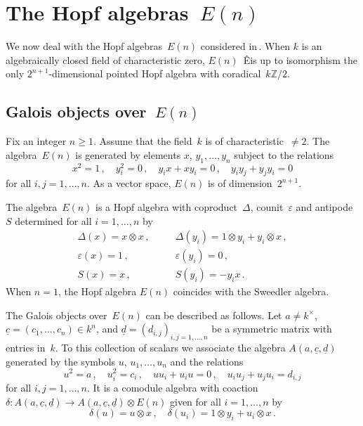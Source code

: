 \documentclass[11pt, a4paper]{amsart}
\theoremstyle{definition}
\numberwithin{equation}{section}
\begin{document}
\section{The Hopf algebras~$E(n)$}\label{sec-En}

We now deal with the Hopf algebras~$E(n)$ considered in\,\cite{BDG, BC, Ne, PvO}.
When $k$ is an algebraically closed field of characteristic zero, 
$E(n)$~Êis up to isomorphism the only $2^{n+1}$-dimensional pointed Hopf algebra with coradical~$k{\mathbb Z}/2$.

\subsection{Galois objects over~$E(n)$}\label{ssec-En}

Fix an integer $n\geq 1$. Assume that the field~$k$ is of characteristic~$\neq 2$.
The algebra~$E(n)$ is generated by elements $x$, $y_1, \ldots, y_n$
subject to the relations
\begin{equation*}
x^2=1 \, , \quad y_i^2=0 \, , \quad y_ix+xy_i=0 \, ,\quad y_iy_j+y_jy_i=0 
\end{equation*}
for all $i,j= 1, \ldots, n$.
As a vector space, $E(n)$ is of dimension~$2^{n+1}$.

The algebra~$E(n)$ is a Hopf algebra with coproduct~$\Delta$, counit~${\varepsilon}$ and antipode~$S$ 
determined for all $i= 1, \ldots, n$ by
\begin{eqnarray}\label{En-coproduct}
\Delta(x) = x \otimes x\, ,& \quad & \Delta(y_i) = 1 \otimes y_i + y_i \otimes x\, ,\\
{\varepsilon}(x) = 1\, ,& \quad & {\varepsilon}(y_i) = 0 \, ,\\
S(x) = x\, ,& \quad & S(y_i) = - y_ix \, .
\end{eqnarray}
When $n=1$, the Hopf algebra $E(n)$ coincides with the Sweedler algebra.

The Galois objects over~$E(n)$ can be described as follows.
Let $a\neq k^{\times}$, $\underline{c} = (c_1, \ldots, c_n) \in k^n$, and $\underline{d} = (d_{i,j})_{i,j = 1, \dots, n}$
be a symmetric matrix with entries in~$k$.
To this collection of scalars we associate
the algebra $A(a,\underline{c}, \underline{d})$ generated by the symbols $u$, $u_1, \ldots, u_n$
and the relations
\begin{equation}
u^2 = a\, , \quad u_i^2 = c_i \, , \quad  
uu_i + u_i u = 0\, , \quad u_iu_j + u_j u_i = d_{i,j}
\end{equation}
for all $i,j = 1, \dots, n$. It is a comodule algebra with coaction 
$\delta: A(a,\underline{c}, \underline{d}) \to A(a,\underline{c}, \underline{d}) \otimes E(n)$
given for all $i = 1, \ldots, n$ by
\begin{equation}\label{coactionEn}
\delta(u) = u \otimes x \, ,\quad \delta(u_i) = 1 \otimes y_i + u_i \otimes x \, .
\end{equation}
\end{document}
